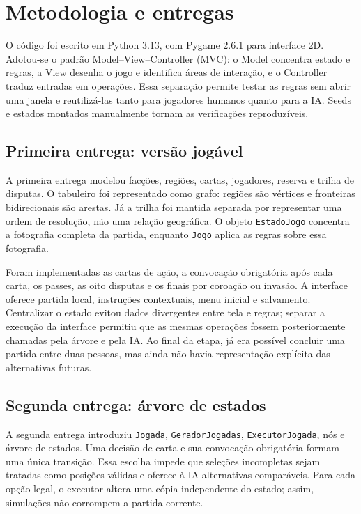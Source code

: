 \documentclass[12pt]{article}
\begin{document}
\section{Metodologia e entregas}

O código foi escrito em Python 3.13, com Pygame 2.6.1 para interface 2D. Adotou-se o padrão Model--View--Controller (MVC): o Model concentra estado e regras, a View desenha o jogo e identifica áreas de interação, e o Controller traduz entradas em operações. Essa separação permite testar as regras sem abrir uma janela e reutilizá-las tanto para jogadores humanos quanto para a IA. Seeds e estados montados manualmente tornam as verificações reproduzíveis.

\subsection{Primeira entrega: versão jogável}

A primeira entrega modelou facções, regiões, cartas, jogadores, reserva e trilha de disputas. O tabuleiro foi representado como grafo: regiões são vértices e fronteiras bidirecionais são arestas. Já a trilha foi mantida separada por representar uma ordem de resolução, não uma relação geográfica. O objeto \texttt{EstadoJogo} concentra a fotografia completa da partida, enquanto \texttt{Jogo} aplica as regras sobre essa fotografia.

Foram implementadas as cartas de ação, a convocação obrigatória após cada carta, os passes, as oito disputas e os finais por coroação ou invasão. A interface oferece partida local, instruções contextuais, menu inicial e salvamento. Centralizar o estado evitou dados divergentes entre tela e regras; separar a execução da interface permitiu que as mesmas operações fossem posteriormente chamadas pela árvore e pela IA. Ao final da etapa, já era possível concluir uma partida entre duas pessoas, mas ainda não havia representação explícita das alternativas futuras.

\subsection{Segunda entrega: árvore de estados}

A segunda entrega introduziu \texttt{Jogada}, \texttt{GeradorJogadas}, \texttt{ExecutorJogada}, nós e árvore de estados. Uma decisão de carta e sua convocação obrigatória formam uma única transição. Essa escolha impede que seleções incompletas sejam tratadas como posições válidas e oferece à IA alternativas comparáveis. Para cada opção legal, o executor altera uma cópia independente do estado; assim, simulações não corrompem a partida corrente.
\end{document}
